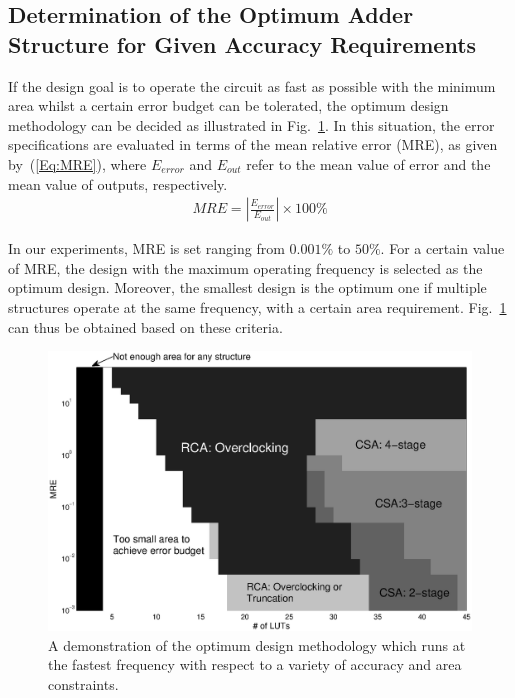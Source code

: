 \documentclass[prodmode,acmtrets]{acmsmall} %
\begin{document}
\subsection{Determination of the Optimum Adder Structure for Given Accuracy Requirements}
If the design goal is to operate the circuit as fast as possible with the minimum area whilst a certain error budget can be tolerated, the optimum design methodology can be decided as illustrated in Fig.~\ref{Fig_CSA_Tradeoff_Error}. In this situation, the error specifications are evaluated in terms of the mean relative error (MRE), as given by~(\ref{Eq:MRE}), where $E_{error}$ and $E_{out}$ refer to the mean value of error and the mean value of outputs, respectively.
%
\begin{eqnarray}\label{Eq:MRE}
  MRE=\left|\frac{E_{error}}{E_{out}}\right|\times 100\%
\end{eqnarray}

In our experiments, MRE is set ranging from $0.001\%$ to $50\%$. For a certain value of MRE, the design with the maximum operating frequency is selected as the optimum design. Moreover, the smallest design is the optimum one if multiple structures operate at the same frequency, with a certain area requirement. Fig.~\ref{Fig_CSA_Tradeoff_Error} can thus be obtained based on these criteria.
%
\begin{figure}[t]
    \centering
    \vspace{-2ex}
    \includegraphics[width=4.5in]{./Figures/Tradeoff_Error2.eps}
    \vspace{-2ex}
    \caption{A demonstration of the optimum design methodology which runs at the fastest frequency with respect to a variety of accuracy and area constraints.}
    \label{Fig_CSA_Tradeoff_Error}
\end{figure}
\end{document}
